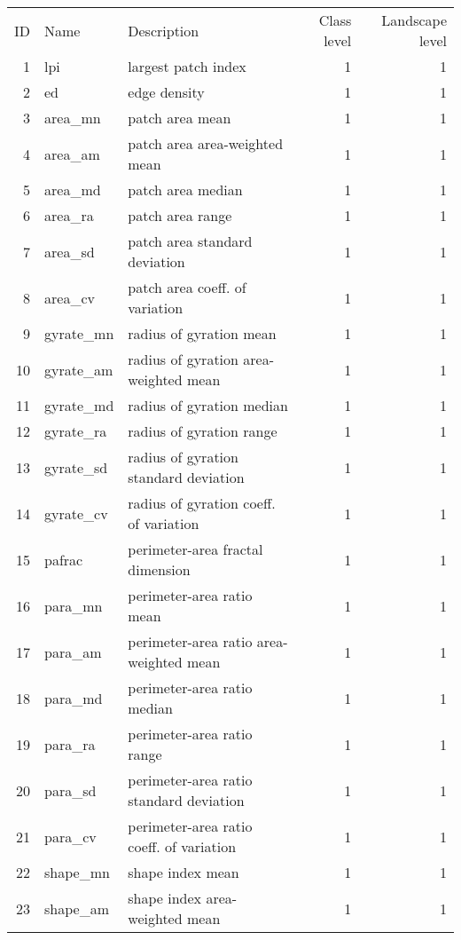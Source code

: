 \begin{longtable}{rllrr}
  \hline
ID & Name & Description & Class level & Landscape level \\ 
   1 & lpi & largest patch index &   1 &   1 \\ 
    2 & ed & edge density &   1 &   1 \\ 
    3 & area\_mn & patch area mean &   1 &   1 \\ 
    4 & area\_am & patch area area-weighted mean &   1 &   1 \\ 
    5 & area\_md & patch area median &   1 &   1 \\ 
    6 & area\_ra & patch area range &   1 &   1 \\ 
    7 & area\_sd & patch area standard deviation &   1 &   1 \\ 
    8 & area\_cv & patch area coeff. of variation &   1 &   1 \\ 
    9 & gyrate\_mn & radius of gyration mean &   1 &   1 \\ 
   10 & gyrate\_am & radius of gyration area-weighted mean &   1 &   1 \\ 
   11 & gyrate\_md & radius of gyration median &   1 &   1 \\ 
   12 & gyrate\_ra & radius of gyration range &   1 &   1 \\ 
   13 & gyrate\_sd & radius of gyration standard deviation &   1 &   1 \\ 
   14 & gyrate\_cv & radius of gyration coeff. of variation &   1 &   1 \\ 
   15 & pafrac & perimeter-area fractal dimension &   1 &   1 \\ 
   16 & para\_mn & perimeter-area ratio mean &   1 &   1 \\ 
   17 & para\_am & perimeter-area ratio area-weighted mean &   1 &   1 \\ 
   18 & para\_md & perimeter-area ratio median &   1 &   1 \\ 
   19 & para\_ra & perimeter-area ratio range &   1 &   1 \\ 
   20 & para\_sd & perimeter-area ratio standard deviation &   1 &   1 \\ 
   21 & para\_cv & perimeter-area ratio coeff. of variation &   1 &   1 \\ 
   22 & shape\_mn & shape index mean &   1 &   1 \\ 
   23 & shape\_am & shape index area-weighted mean &   1 &   1 \\ 

\end{longtable}
